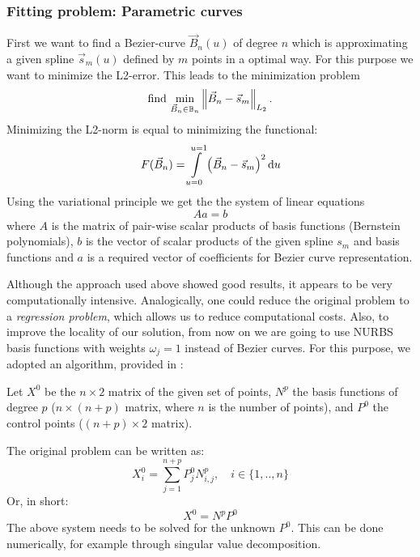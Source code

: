 \subsubsection{Fitting problem: Parametric curves}
First we want to find a Bezier-curve $\vec{B}_n\left(u\right)$ of degree $n$ which is approximating a given spline $\vec{s}_m\left(u\right)$ defined by $m$ points in a optimal way. For this purpose we want to minimize the L2-error. This leads to the minimization problem
\begin{equation}
\text{find\ } \underset{\vec{B}_n\in \mathbb{B}_n}{\min} \Ltwonorm{\vec{B}_n-\vec{s}_m}.
\end{equation}
Minimizing the L2-norm is equal to minimizing the functional:
\begin{equation}
F(\vec{B}_n)=\int\limits_{u=0}^{u=1} \left(\vec{B}_n-\vec{s}_m\right)^2\du
\end{equation}
Using the variational principle we get the the system of linear equations
\begin{equation}
A a = b
\end{equation}
where $A$ is the matrix of pair-wise scalar products of basis functions (Bernstein polynomials), $b$ is the vector of scalar products of the given spline $s_{m}$ and basis functions and $a$ is a required vector of coefficients for Bezier curve representation.

Although the approach used above showed good results, it appears to be very computationally intensive. Analogically, one could reduce the original problem to a \emph{regression problem}, which allows us to reduce computational costs. Also, to improve the locality of our solution, from now on we are going to use NURBS basis functions with weights $\omega_{j} = 1$ instead of Bezier curves. For this purpose, we adopted an algorithm, provided in \cite{becker2011advanced}:

Let $X^{0}$ be the $n \times 2$ matrix of the given set of points, $N^{p}$ the basis functions of degree $p$ ($n \times (n+p)$ matrix, where $n$ is the number of points), and $P^{0}$ the control points ($(n+p) \times 2$ matrix).

The original problem can be written as:
\begin{equation}
X_{i}^{0} = \sum\limits_{j=1}^{n+p} P_{j}^{0} N_{i,j}^{p}, \quad i \in \{1,..,n\}
\end{equation}
Or, in short:
\begin{equation}
X^{0} = N^{p} P^{0}
\end{equation}
The above system needs to be solved for the unknown $P^{0}$. This can be done numerically, for example through singular value decomposition. 

